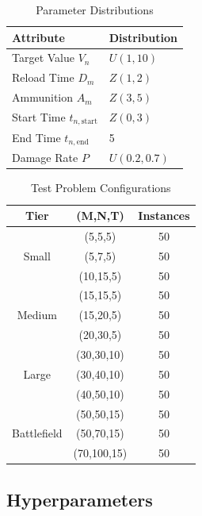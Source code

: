 \documentclass[smallcondensed]{svjour3}
\begin{document}
\begin{table}[htbp]
\centering
\small
\caption{Parameter Distributions}
\label{tab:parameter_distributions}
\begin{tabular}{l|l}
\hline
\textbf{Attribute} & \textbf{Distribution} \\ \hline
Target Value $V_n$ & $U(1, 10)$ \\
Reload Time $D_m$ & $Z(1, 2)$ \\
Ammunition $A_m$ & $Z(3, 5)$ \\
Start Time $t_{n,\text{start}}$ & $Z(0, 3)$ \\
End Time $t_{n,\text{end}}$ & 5 \\
Damage Rate $P$ & $U(0.2, 0.7)$ \\ \hline
\end{tabular}
\end{table}

\begin{table}[htbp]
\centering
\small
\caption{Test Problem Configurations}
\label{tab:problem_instance_scales}
\begin{tabular}{c|c|c}
\hline
\textbf{Tier} & \textbf{(M,N,T)} & \textbf{Instances} \\ \hline
\multirow{3}{*}{Small}      & (5,5,5)    & 50 \\
                            & (5,7,5)    & 50 \\
                            & (10,15,5)  & 50 \\ \hline
\multirow{3}{*}{Medium}     & (15,15,5)  & 50 \\
                            & (15,20,5)  & 50 \\
                            & (20,30,5)  & 50 \\ \hline
\multirow{3}{*}{Large}      & (30,30,10) & 50 \\
                            & (30,40,10) & 50 \\
                            & (40,50,10) & 50 \\ \hline
\multirow{3}{*}{Battlefield} & (50,50,15) & 50 \\
                            & (50,70,15) & 50 \\
                            & (70,100,15) & 50 \\ \hline
\end{tabular}
\end{table}

\subsection{Hyperparameters}
\end{document}
